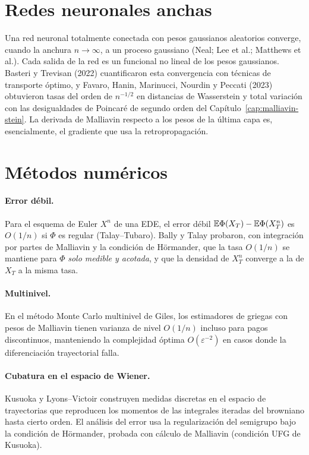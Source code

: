 \section{Redes neuronales anchas}
Una red neuronal totalmente conectada con pesos gaussianos aleatorios converge, cuando la
anchura $n\to\infty$, a un proceso gaussiano (Neal; Lee et al.; Matthews et al.). Cada salida de la
red es un funcional no lineal de los pesos gaussianos. Basteri y Trevisan (2022) cuantificaron esta
convergencia con técnicas de transporte óptimo, y Favaro, Hanin, Marinucci, Nourdin y Peccati
(2023) obtuvieron tasas del orden de $n^{-1/2}$ en distancias de Wasserstein y total variación con las
desigualdades de Poincaré de segundo orden del Capítulo~\ref{cap:malliavin-stein}. La derivada de Malliavin respecto
a los pesos de la última capa es, esencialmente, el gradiente que usa la retropropagación.

\section{Métodos numéricos}

\paragraph{Error débil.} Para el esquema de Euler $X^n$ de una EDE, el error débil $\mathbb{E}\Phi(X_T)-\mathbb{E}\Phi(X^n_T)$ es
$O(1/n)$ si $\Phi$ es regular (Talay--Tubaro). Bally y Talay probaron, con integración por partes de
Malliavin y la condición de Hörmander, que la tasa $O(1/n)$ se mantiene para $\Phi$ \emph{solo medible y
acotada}, y que la densidad de $X^n_T$ converge a la de $X_T$ a la misma tasa.

\paragraph{Multinivel.} En el método Monte Carlo multinivel de Giles, los estimadores de griegas con
pesos de Malliavin tienen varianza de nivel $O(1/n)$ incluso para pagos discontinuos, manteniendo
la complejidad óptima $O(\varepsilon^{-2})$ en casos donde la diferenciación trayectorial falla.

\paragraph{Cubatura en el espacio de Wiener.} Kusuoka y Lyons--Victoir construyen medidas discretas
en el espacio de trayectorias que reproducen los momentos de las integrales iteradas del browniano
hasta cierto orden. El análisis del error usa la regularización del semigrupo bajo la condición de
Hörmander, probada con cálculo de Malliavin (condición UFG de Kusuoka).

